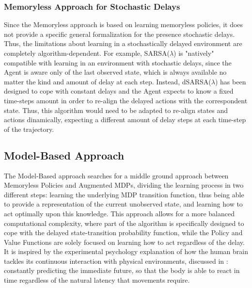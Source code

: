             \subsubsection{Memoryless Approach for Stochastic Delays}
                Since the Memoryless approach is based on learning memoryless policies, it does not provide a specific general formalization for the presence stochastic delays. Thus, the limitations about learning in a stochastically delayed environment are completely algorithm-dependent. For example, SARSA($\lambda$) is "natively" compatible with learning in an environment with stochastic delays, since the Agent is aware only of the last observed state, which is always available no matter the kind and amount of delay at each step. Instead, dSARSA($\lambda$) has been designed to cope with constant delays and the Agent expects to know a fixed time-steps amount in order to re-align the delayed actions with the correspondent state. Thus, this algorithm would need to be adapted to re-align states and actions dinamically, expecting a different amount of delay steps at each time-step of the trajectory. \newline
            
        \newpage
        \subsection{Model-Based Approach}
            
        
            \label{subs:modelbasedapproach}
            The Model-Based approach searches for a middle ground approach between Memoryless Policies and Augmented MDPs, dividing the learning process in two different steps: learning the underlying MDP transition function, thus being able to provide a representation of the current unobserved state, and learning how to act optimally upon this knowledge. This approach allows for a more balanced computational complexity, where part of the algorithm is specifically designed to cope with the delayed state-transition probability function, while the Policy and Value Functions are solely focused on learning how to act regardless of the delay. It is inspired by the experimental psychology explanation of how the human brain tackles its continuous interaction with physical environments, discussed in : constantly predicting the immediate future, so that the body is able to react in time regardless of the natural latency that movements require.
            
